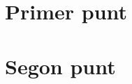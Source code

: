 \documentclass[%
catalan,
]{texMemocat}
\begin{document}
\maketitle

\section{Primer punt}
\lipsum[1-2]
\section{Segon punt}
\lipsum[3-7]
\end{document}
